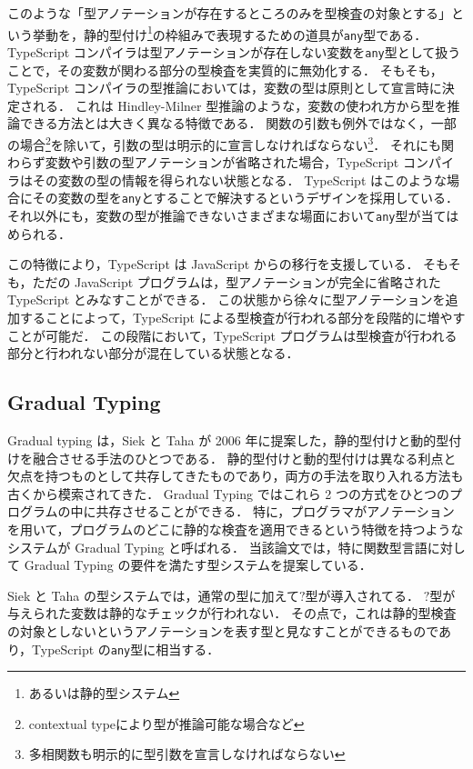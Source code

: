 このような「型アノテーションが存在するところのみを型検査の対象とする」という挙動を，静的型付け\footnote{あるいは静的型システム}の枠組みで表現するための道具が\texttt{any}型である．
TypeScript コンパイラは型アノテーションが存在しない変数を\texttt{any}型として扱うことで，その変数が関わる部分の型検査を実質的に無効化する．
そもそも，TypeScript コンパイラの型推論においては，変数の型は原則として宣言時に決定される．
これは Hindley-Milner 型推論\cite{MILNER1978348}のような，変数の使われ方から型を推論できる方法とは大きく異なる特徴である．
関数の引数も例外ではなく，一部の場合\footnote{contextual typeにより型が推論可能な場合など}を除いて，引数の型は明示的に宣言しなければならない\footnote{多相関数も明示的に型引数を宣言しなければならない}．
それにも関わらず変数や引数の型アノテーションが省略された場合，TypeScript コンパイラはその変数の型の情報を得られない状態となる．
TypeScript はこのような場合にその変数の型を\texttt{any}とすることで解決するというデザインを採用している．
それ以外にも，変数の型が推論できないさまざまな場面において\texttt{any}型が当てはめられる．

この特徴により，TypeScript は JavaScript からの移行を支援している．
そもそも，ただの JavaScript プログラムは，型アノテーションが完全に省略された TypeScript とみなすことができる．
この状態から徐々に型アノテーションを追加することによって，TypeScript による型検査が行われる部分を段階的に増やすことが可能だ．
この段階において，TypeScript プログラムは型検査が行われる部分と行われない部分が混在している状態となる．

\subsection{Gradual Typing}

Gradual typing \cite{GradualTyping}は，Siek と Taha が 2006 年に提案した，静的型付けと動的型付けを融合させる手法のひとつである．
静的型付けと動的型付けは異なる利点と欠点を持つものとして共存してきたものであり，両方の手法を取り入れる方法も古くから模索されてきた．
Gradual Typing ではこれら 2 つの方式をひとつのプログラムの中に共存させることができる．
特に，プログラマがアノテーションを用いて，プログラムのどこに静的な検査を適用できるという特徴を持つようなシステムが Gradual Typing と呼ばれる．
当該論文では，特に関数型言語に対して Gradual Typing の要件を満たす型システムを提案している．

Siek と Taha の型システムでは，通常の型に加えて$?$型が導入されてる．
$?$型が与えられた変数は静的なチェックが行われない．
その点で，これは静的型検査の対象としないというアノテーションを表す型と見なすことができるものであり，TypeScript の\texttt{any}型に相当する．

